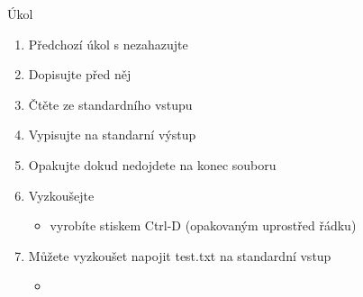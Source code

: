 \begin{frame}{Úkol}

  \begin{enumerate}
    \item Předchozí úkol s  nezahazujte
    \item Dopisujte před něj
    \item Čtěte ze standardního vstupu
    \item Vypisujte na standarní výstup
    \item Opakujte dokud nedojdete na konec souboru
    \item Vyzkoušejte
    \begin{itemize}
      \item {} vyrobíte stiskem Ctrl-D (opakovaným uprostřed řádku)
    \end{itemize}

    \item Můžete vyzkoušet napojit test.txt na standardní vstup
    \begin{itemize}
      \item {}
    \end{itemize}

  \end{enumerate}

\end{frame}

